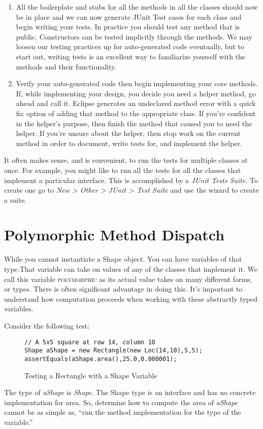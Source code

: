 \documentclass[nobib]{tufte-handout}
\begin{document}
\begin{enumerate}
\item All the boilerplate and stubs for all the methods in all the classes should now be in place and we can now generate JUnit Test cases for each class and begin writing your tests. \newline
In practice you should test any method that is public. Constructors can be tested implicitly through the methods. We may loosen our testing practices up for auto-generated code eventually, but to start out, writing tests is an excellent way to familiarize yourself with the methods and their functionality.

\item Verify your auto-generated code then begin implementing your core methods. \newline
If, while implementing your design, you decide you need a helper method, go ahead and call it. Eclipse generates an undeclared method error with a quick fix option of adding that method to the appropriate class. If you're confident in the helper's purpose, then finish the method that caused you to need the helper. If you're unsure about the helper, then stop work on the current method in order to document, write tests for, and implement the helper.
\end{enumerate}

It often makes sense, and is convenient, to run the tests for multiple classes at once. For example, you might like to run all the tests for all the classes that implement a particular interface. This is accomplished by a \textit{JUnit Tests Suite}. To create one go to \textit{New > Other > JUnit > Test Suite} and use the wizard to create a suite.

\section{Polymorphic Method Dispatch}

While you cannot instantiate a Shape object. You can have variables of that type.That variable can take on values of any of the classes that implement it. We call this variable \textsc{polymorphic} as its actual value takes on many different forms, or types. There is often significant advantage in doing this. It's important to understand how computation proceeds when working with these abstractly typed variables.

Consider the following test:
\begin{figure}
\begin{lstlisting}
// A 5x5 square at row 14, column 10
Shape aShape = new Rectangle(new Loc(14,10),5,5);
assertEquals(aShape.area(),25.0,0.000001);
\end{lstlisting}
\caption{Testing a Rectangle with a Shape Variable}
\end{figure}
The type of \textit{aShape} is \textit{Shape}. The Shape type is an interface and has no concrete implementation for area. So, determine how to compute the area of \textit{aShape} cannot be as simple as, ``run the method implementation for the type of the variable.''
\end{document}
